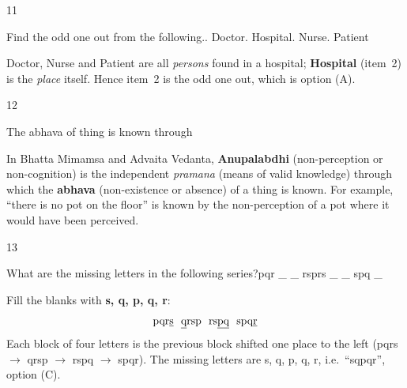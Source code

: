 \begin{question}{11}
{Find the odd one out from the following.. Doctor. Hospital. Nurse. Patient\par}
\begin{explain}
Doctor, Nurse and Patient are all \emph{persons} found in a hospital; \textbf{Hospital} (item~2) is the \emph{place} itself. Hence item~2 is the odd one out, which is option (A).
\end{explain}
\end{question}

\begin{question}{12}
{The abhava of thing is known through\par}
\begin{explain}
In Bhatta Mimamsa and Advaita Vedanta, \textbf{Anupalabdhi} (non-perception or non-cognition) is the independent \emph{pramana} (means of valid knowledge) through which the \textbf{abhava} (non-existence or absence) of a thing is known. For example, ``there is no pot on the floor'' is known by the non-perception of a pot where it would have been perceived.
\end{explain}
\end{question}

\begin{question}{13}
{What are the missing letters in the following series?\newline pqr \_ \_ rsprs \_ \_ spq \_\par}
\begin{explain}
Fill the blanks with \textbf{s, q, p, q, r}:
\[\text{pqr\underline{s}}\ \ \text{\underline{q}rsp}\ \ \text{rs\underline{p}\underline{q}}\ \ \text{spq\underline{r}}\]
Each block of four letters is the previous block shifted one place to the left (pqrs $\rightarrow$ qrsp $\rightarrow$ rspq $\rightarrow$ spqr). The missing letters are s, q, p, q, r, i.e.\ ``sqpqr'', option (C).
\end{explain}
\end{question}

